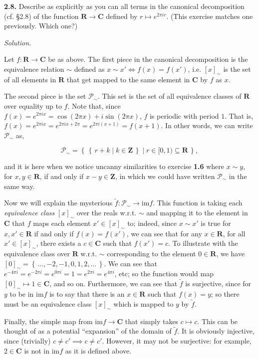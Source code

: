 \documentclass[14pt,parskip=full]{scrartcl}
\newcommand{\exercise}[3]{
\noindent
\textbf{#1.} #2

\noindent
\textit{Solution.}{\let\tpar\par \let\par\relax #3}
}
\newcommand{\set}[1]{\left\{\,#1\,\right\}}
\newcommand{\im}{\mathrm{im}}
\begin{document}
\exercise{2.8}{Describe as explicitly as you can all terms in the canonical
decomposition (cf. \S2.8) of the function $\mathbf{R}\to\mathbf{C}$ defined by
$r\mapsto e^{2\pi ir}$. (This exercise matches one previously. Which one?)}{

Let $f:\mathbf{R}\to\mathbf{C}$ be as above. The first piece in the canonical
decomposition is the equivalence relation $\sim$ defined as $x \sim x' \iff f(x) =
f(x')$, i.e. $[x]_{\sim}$ is the set of all elements in $\mathbf{R}$ that get
mapped to the same element in $\mathbf{C}$ by $f$ as $x$.

\tpar
The second piece is the set $\mathscr{P}_{\sim}$. This set is the set of all
equivalence classes of $\mathbf{R}$ over equality up to $f$. Note that, since
$f(x) = e^{2\pi i x} = \cos(2\pi x) + i\sin(2\pi x)$, $f$ is periodic with
period $1$. That is, $f(x) = e^{2\pi i x} = e^{2\pi i x + 2\pi} = e^{2\pi i (x +
1)} = f(x+1)$. In other words, we can write $\mathscr{P}_{\sim}$ as,

\[ \mathscr{P}_{\sim} = \set{\set{r + k\mid k\in\mathbf{Z}}\mid
r\in[0,1)\subseteq\mathbf{R}}, \]

and it is here when we notice uncanny similarities to exercise \textbf{1.6}
where $x\sim y$, for $x,y\in\mathbf{R}$, if and only if $x-y\in\mathbf{Z}$, in
which we could have written $\mathscr{P}_{\sim}$ in the same way. 

\tpar
Now we will explain the mysterious $\tilde{f}:\mathscr{P}_{\sim}\to\im f$. This
function is taking each \textit{equivalence class} $[x]_{\sim}$ over the reals
w.r.t. $\sim$ and mapping it to the element in $\mathbf{C}$ that $f$ maps each
element $x'\in[x]_{\sim}$ to; indeed, since $x\sim x'$ is true for
$x,x'\in\mathbf{R}$ if and only if $f(x)=f(x')$, we can see that for any
$x\in\mathbf{R}$, for all $x'\in[x]_{\sim}$, there exists a $c\in\mathbf{C}$
such that $f(x') = c$. To illustrate with the equivalence class over
$\mathbf{R}$ w.r.t. $\sim$ corresponding to the element $0\in\mathbf{R}$, we
have $[0]_{\sim} = \set{\dots, -2, -1, 0, 1, 2, \dots}$.  We can see that
$e^{-4\pi i} = e^{-2\pi i} = e^{0\pi i} = 1 = e^{2\pi i} = e^{4\pi i}$, etc; so
the function would map $[0]_{\sim}\mapsto1\in\mathbf{C}$, and so on.
Furthermore, we can see that $\tilde{f}$ is surjective, since for $y$ to be in
$\im f$ is to say that there is an $x\in\mathbf{R}$ such that $f(x) = y$; so
there must be an equivalence class $[x]_{\sim}$ which is mapped to $y$ by
$\tilde{f}$.

\tpar
Finally, the simple map from $\im f\to\mathbf{C}$ that simply takes $c\mapsto
c$. This can be thought of as a potential ``expansion'' of the domain of
$\tilde{f}$. It is obviously injective, since (trivially) $c\neq c'\implies
c\neq c'$. However, it may not be surjective: for example, $2\in\mathbf{C}$ is
not in $\im f$ as it is defined above.

}
\end{document}
